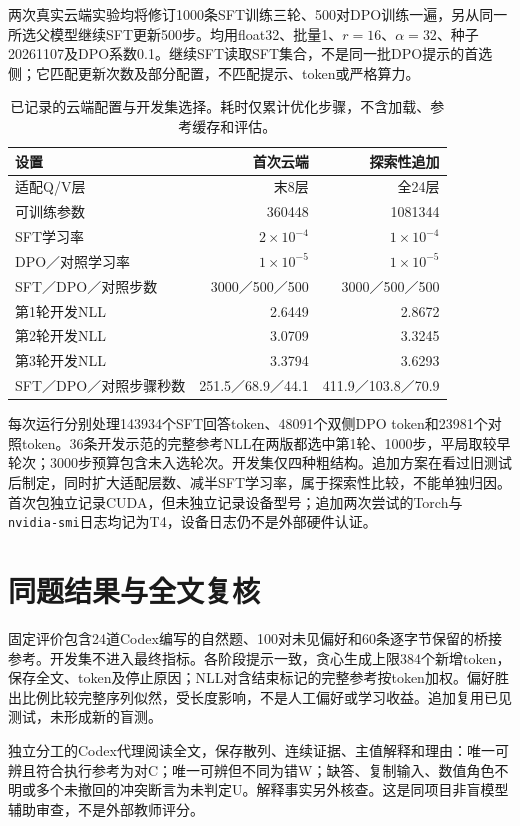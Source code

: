两次真实云端实验均将修订1000条SFT训练三轮、500对DPO训练一遍，另从同一所选父模型继续SFT更新500步。均用float32、批量1、$r=16$、$\alpha=32$、种子20261107及DPO系数0.1。继续SFT读取SFT集合，不是同一批DPO提示的首选侧；它匹配更新次数及部分配置，不匹配提示、token或严格算力。

\begin{table}[H]\centering\small
\caption{已记录的云端配置与开发集选择。耗时仅累计优化步骤，不含加载、参考缓存和评估。}\label{tab:training-protocol}
\begin{tabularx}{\linewidth}{@{}Yrr@{}}\toprule
设置 & 首次云端 & 探索性追加\\\midrule
适配Q/V层 & 末8层 & 全24层\\
可训练参数 & 360448 & 1081344\\
SFT学习率 & $2\times10^{-4}$ & $1\times10^{-4}$\\
DPO／对照学习率 & $1\times10^{-5}$ & $1\times10^{-5}$\\
SFT／DPO／对照步数 & 3000／500／500 & 3000／500／500\\
第1轮开发NLL & 2.6449 & 2.8672\\
第2轮开发NLL & 3.0709 & 3.3245\\
第3轮开发NLL & 3.3794 & 3.6293\\
SFT／DPO／对照步骤秒数 & 251.5／68.9／44.1 & 411.9／103.8／70.9\\\bottomrule
\end{tabularx}
\end{table}\FloatBarrier

每次运行分别处理143934个SFT回答token、48091个双侧DPO token和23981个对照token。36条开发示范的完整参考NLL在两版都选中第1轮、1000步，平局取较早轮次；3000步预算包含未入选轮次。开发集仅四种粗结构。追加方案在看过旧测试后制定，同时扩大适配层数、减半SFT学习率，属于探索性比较，不能单独归因。首次包独立记录CUDA，但未独立记录设备型号；追加两次尝试的Torch与\texttt{nvidia-smi}日志均记为T4，设备日志仍不是外部硬件认证。

\section{同题结果与全文复核}
固定评价包含24道Codex编写的自然题、100对未见偏好和60条逐字节保留的桥接参考。开发集不进入最终指标。各阶段提示一致，贪心生成上限384个新增token，保存全文、token及停止原因；NLL对含结束标记的完整参考按token加权。偏好胜出比例比较完整序列似然，受长度影响，不是人工偏好或学习收益。追加复用已见测试，未形成新的盲测。

独立分工的Codex代理阅读全文，保存散列、连续证据、主值解释和理由：唯一可辨且符合执行参考为对C；唯一可辨但不同为错W；缺答、复制输入、数值角色不明或多个未撤回的冲突断言为未判定U。解释事实另外核查。这是同项目非盲模型辅助审查，不是外部教师评分。


